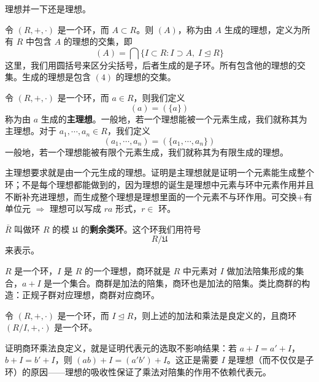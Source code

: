 \begin{note}[理想并一下还是理想]
理想并一下还是理想。
\end{note}

\begin{definition}[定义 2.13：生成理想的定义]
令 $(R,+,\cdot)$ 是一个环，而 $A\subset R$。则 $(A)$，称为由 $A$ 生成的理想，定义为所有 $R$ 中包含 $A$ 的理想的交集，即
\[
(A)=\bigcap\{I\subset R:I\supset A,\;I\trianglelefteq R\}
\]
这里，我们用圆括号来区分尖括号，后者生成的是子环。所有包含他的理想的交集。生成的理想是包含 $(4)$ 的理想的交集。
\end{definition}

\begin{definition}[定义 2.14：主理想]
令 $(R,+,\cdot)$ 是一个环，而 $a\in R$，则我们定义
\[
(a)=(\{a\})
\]
称为由 $a$ 生成的\textbf{主理想}。一般地，若一个理想能被一个元素生成，我们就称其为主理想。对于 $a_1,\cdots,a_n\in R$，我们定义
\[
(a_1,\cdots,a_n)=(\{a_1,\cdots,a_n\})
\]
一般地，若一个理想能被有限个元素生成，我们就称其为有限生成的理想。

主理想要求就是由一个元生成的理想。证明是主理想就是证明一个元素能生成整个环；不是每个理想都能做到的，因为理想的诞生是理想中元素与环中元素作用并且不断补充进理想，而生成整个理想是理想里面的一个元素不与环作用。可交换+有单位元 $\Rightarrow$ 理想可以写成 $ra$ 形式，$r\in$ 环。
\end{definition}

\begin{definition}
$\bar{R}$ 叫做环 $R$ 的模 $\mathfrak{U}$ 的\textbf{剩余类环}。这个环我们用符号
\[
R/\mathfrak{U}
\]
来表示。
\end{definition}

\begin{note}[定义2 11商环]
$R$ 是一个环，$I$ 是 $R$ 的一个理想，商环就是 $R$ 中元素对 $I$ 做加法陪集形成的集合，$a+I$ 是一个集合。商群是加法的陪集，商环也是加法的陪集。类比商群的构造：正规子群对应理想，商群对应商环。
\end{note}

\begin{proposition}
令 $(R,+,\cdot)$ 是一个环，而 $I\trianglelefteq R$，则上述的加法和乘法是良定义的，且商环 $(R/I,+,\cdot)$ 是一个环。
\end{proposition}

\begin{note}[商环良定义的关键]
证明商环乘法良定义，就是证明代表元的选取不影响结果：若 $a+I=a'+I$，$b+I=b'+I$，则 $(ab)+I=(a'b')+I$。这正是需要 $I$ 是理想（而不仅仅是子环）的原因——理想的吸收性保证了乘法对陪集的作用不依赖代表元。
\end{note}

